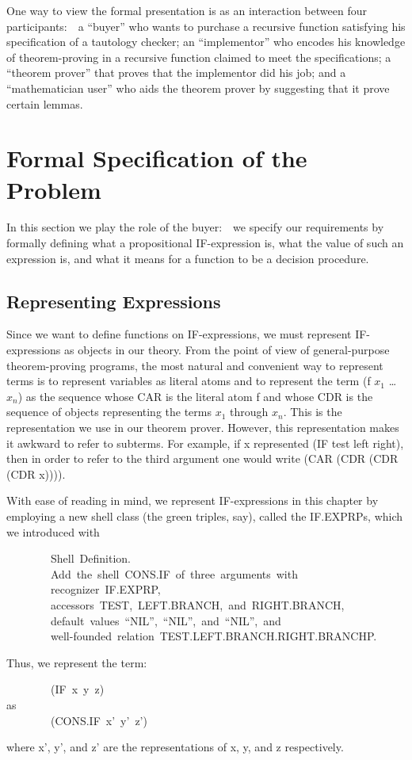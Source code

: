 \documentclass[11pt]{book}
\newenvironment{pubasis}{\begin{flushleft}\ttfamily\small}{\normalsize\rmfamily\end{flushleft}}
\newcommand{\pubdefaulttextsize}{\large}
\begin{document}
One way to view the formal presentation
is as an interaction between four participants:~~a ``buyer'' who
wants to purchase a recursive function satisfying his specification
of a tautology checker; an ``implementor'' who encodes his knowledge
of theorem-proving in a recursive function claimed to meet the
specifications; a ``theorem prover'' that proves that the implementor
did his job; and a ``mathematician user'' who aids the theorem prover
by suggesting that it prove certain lemmas.
\section{Formal Specification of the Problem}
\pubdefaulttextsize
In this section we play the role of the buyer:~~we specify our
requirements by formally defining what a propositional IF-expression is,
what the value of such an expression is, and what it means
for a function to be a decision procedure.
\subsection{Representing Expressions}
\pubdefaulttextsize
Since we want to define functions on IF-expressions, we
must represent IF-expressions as objects in our theory.
From the point of view of general-purpose theorem-proving programs, the most natural and convenient
way to  represent
terms is to represent variables as literal atoms and to represent
the term (f $x_{1}$ \ldots{} $x_{n}$) as the sequence whose CAR is the literal atom f and
whose CDR is the sequence of objects representing the terms $x_{1}$ through
$x_{n}$.  This is the representation we use in our theorem prover.  However,
this representation  makes it awkward to refer to subterms.
For example, if x    represented 
(IF test left right), then in order to refer to the third argument one
would write (CAR (CDR (CDR (CDR x)))).

With ease of reading in mind,
we  represent IF-expressions in this chapter by employing
a new shell class (the green triples, say), called the IF.EXPRPs,
which we introduced with
\begin{pubasis}
~~~~~~~~Shell~Definition.\\
~~~~~~~~Add~the~shell~CONS.IF~of~three~arguments~with\\
~~~~~~~~recognizer~IF.EXPRP,\\
~~~~~~~~accessors~TEST,~LEFT.BRANCH,~and~RIGHT.BRANCH,\\
~~~~~~~~default~values~``NIL'',~``NIL'',~and~``NIL'',~and\\
~~~~~~~~well-founded~relation~TEST.LEFT.BRANCH.RIGHT.BRANCHP.\\
\end{pubasis}
Thus, we  represent the term:
\begin{pubasis}
~~~~~~~~(IF~x~y~z)\\
as\\
~~~~~~~~(CONS.IF~x'~y'~z')\\
\end{pubasis}
where x', y', and z' are the representations of x, y, and z respectively.
\end{document}
